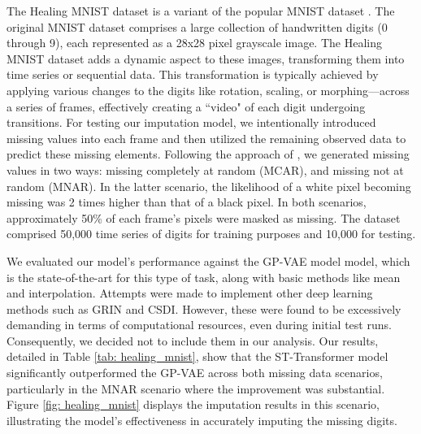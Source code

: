 \documentclass[11pt]{article}
\begin{document}
The Healing MNIST dataset \citep{krishnan2015deep} is a variant of the popular MNIST dataset \citep{lecun1998gradient}. The original MNIST dataset comprises a large collection of handwritten digits (0 through 9), each represented as a 28x28 pixel grayscale image. The Healing MNIST dataset adds a dynamic aspect to these images, transforming them into time series or sequential data. This transformation is typically achieved by applying various changes to the digits like rotation, scaling, or morphing—across a series of frames, effectively creating a ``video" of each digit undergoing transitions. For testing our imputation model, we intentionally introduced missing values into each frame and then utilized the remaining observed data to predict these missing elements. Following the approach of \citet{fortuin2020gp}, we generated missing values in two ways: missing completely at random (MCAR), and missing not at random (MNAR). In the latter scenario, the likelihood of a white pixel becoming missing was 2 times higher than that of a black pixel. In both scenarios, approximately 50\% of each frame's pixels were masked as missing. The dataset comprised 50,000 time series of digits for training purposes and 10,000 for testing. 

We evaluated our model’s performance against the GP-VAE model \citep{fortuin2020gp} model, which is the state-of-the-art for this type of task, along with basic methods like mean and interpolation. Attempts were made to implement other deep learning methods such as GRIN and CSDI. However, these were found to be excessively demanding in terms of computational resources, even during initial test runs. Consequently, we decided not to include them in our analysis. Our results, detailed in Table \ref{tab: healing_mnist}, show that the ST-Transformer model significantly outperformed the GP-VAE across both missing data scenarios, particularly in the MNAR scenario where the improvement was substantial. Figure \ref{fig: healing_mnist} displays the imputation results in this scenario, illustrating the model's effectiveness in accurately imputing the missing digits.
\end{document}

